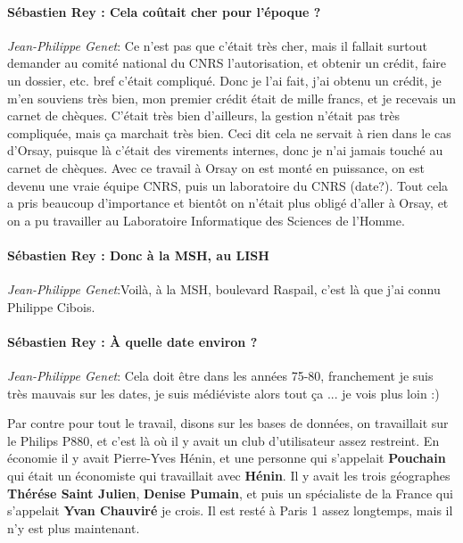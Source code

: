 \paragraph*{Sébastien Rey : Cela coûtait cher pour l'époque ?}

\noindent\emph{Jean-Philippe Genet}: Ce n’est pas que c'était très cher, mais il fallait surtout demander au comité national du CNRS l'autorisation, et obtenir un crédit, faire un dossier, etc. bref c'était compliqué. Donc je l'ai fait, j'ai obtenu un crédit, je m'en souviens très bien, mon premier crédit était de mille francs, et je recevais un carnet de chèques. C'était très bien d'ailleurs, la gestion n'était pas très compliquée, mais ça marchait très bien. Ceci dit cela ne servait à rien dans le cas d'Orsay, puisque là c'était des virements internes, donc je n’ai jamais touché au carnet de chèques. Avec ce travail à Orsay on est monté en puissance, on est devenu une vraie équipe CNRS,  puis un laboratoire du CNRS (date?). Tout cela a pris beaucoup d'importance et bientôt on n'était plus obligé d'aller à Orsay, et on a pu travailler au Laboratoire Informatique des Sciences de l'Homme.

\paragraph*{Sébastien Rey : Donc à la MSH, au LISH}

\noindent\emph{Jean-Philippe Genet}:Voilà, à la MSH, boulevard Raspail, c'est là que j'ai connu Philippe Cibois.

\paragraph*{Sébastien Rey : À quelle date environ ? }

\noindent\emph{Jean-Philippe Genet}: Cela doit être dans les années 75-80, franchement je suis très mauvais sur les dates, je suis médiéviste alors tout ça ... je vois plus loin :)

Par contre pour tout le travail, disons sur les bases de données, on travaillait sur le Philips P880, et c'est là où il y avait un club d'utilisateur assez restreint. En économie il y avait Pierre-Yves Hénin, et une personne qui s'appelait \textbf{Pouchain} qui était un économiste qui travaillait avec \textbf{Hénin}. Il y avait les trois géographes \textbf{Thérése Saint Julien}, \textbf{Denise Pumain}, et puis un spécialiste de la France qui s'appelait \textbf{Yvan Chauviré} je crois. Il est resté à Paris 1 assez longtemps, mais il n'y est plus maintenant.


